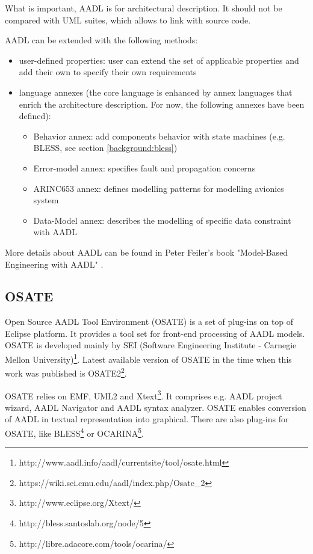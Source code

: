 What is important, AADL is for architectural description. It should not be compared with UML suites, which allows to link with source code.

AADL can be extended with the following methods:
\begin{itemize}
	\item user-defined properties: user can extend the set of applicable properties and add their own to specify their own requirements
	\item {language annexes (the core language is enhanced by annex languages that enrich the architecture description. For now, the following annexes have been defined):
		\begin{itemize}
			\item Behavior annex: add components behavior with state machines (e.g. BLESS, see section \ref{background:bless})
			\item Error-model annex: specifies fault and propagation concerns
			\item ARINC653 annex: defines modelling patterns for modelling avionics system
			\item Data-Model annex: describes the modelling of specific data constraint with AADL
		\end{itemize}
		}
\end{itemize}


More details about AADL can be found in Peter Feiler's book "Model-Based Engineering with AADL" \cite{AadlBook}.


\subsection{OSATE}
\label{background:aadl:osate}

Open Source AADL Tool Environment (OSATE) is a set of plug-ins on top of Eclipse platform. It provides a tool set for front-end processing of AADL models. OSATE is developed mainly by SEI (Software Engineering Institute - Carnegie Mellon University)\footnote{http://www.aadl.info/aadl/currentsite/tool/osate.html}. Latest available version of OSATE in the time when this work was published is OSATE2\footnote{https://wiki.sei.cmu.edu/aadl/index.php/Osate\_2}. 

OSATE relies on EMF, UML2 and Xtext\footnote{http://www.eclipse.org/Xtext/}. It comprises e.g. AADL project wizard, AADL Navigator and AADL syntax analyzer. OSATE enables conversion of AADL in textual representation into graphical. There are also plug-ins for OSATE, like BLESS\footnote{http://bless.santoslab.org/node/5} or OCARINA\footnote{http://libre.adacore.com/tools/ocarina/}.



